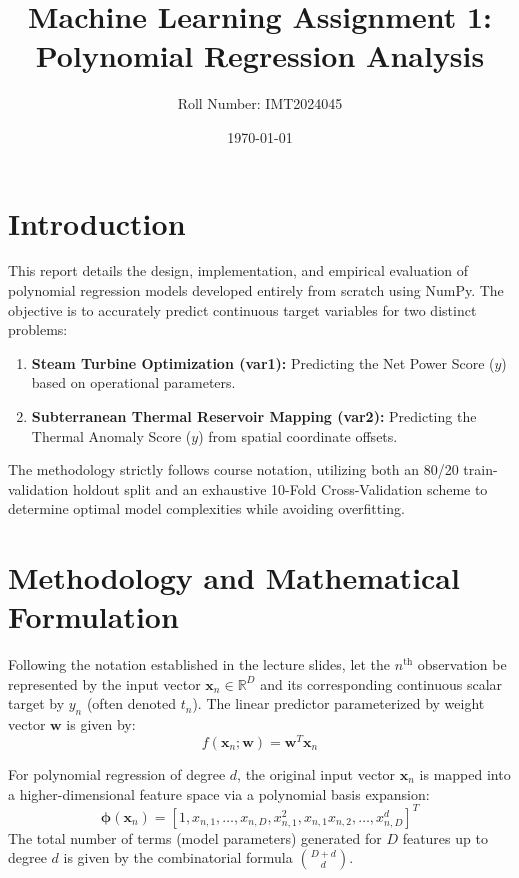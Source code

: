 \documentclass[12pt]{article}
\title{\textbf{Machine Learning Assignment 1: Polynomial Regression Analysis}}
\author{Roll Number: IMT2024045}
\date{\today}
\begin{document}
\maketitle

\section{Introduction}
This report details the design, implementation, and empirical evaluation of polynomial regression models developed entirely from scratch using NumPy. The objective is to accurately predict continuous target variables for two distinct problems:
\begin{enumerate}
    \item \textbf{Steam Turbine Optimization (var1):} Predicting the Net Power Score ($y$) based on operational parameters.
    \item \textbf{Subterranean Thermal Reservoir Mapping (var2):} Predicting the Thermal Anomaly Score ($y$) from spatial coordinate offsets.
\end{enumerate}
The methodology strictly follows course notation, utilizing both an 80/20 train-validation holdout split and an exhaustive 10-Fold Cross-Validation scheme to determine optimal model complexities while avoiding overfitting.

\section{Methodology and Mathematical Formulation}
Following the notation established in the lecture slides, let the $n^{\text{th}}$ observation be represented by the input vector $\mathbf{x}_n \in \mathbb{R}^D$ and its corresponding continuous scalar target by $y_n$ (often denoted $t_n$). The linear predictor parameterized by weight vector $\mathbf{w}$ is given by:
\begin{equation}
f(\mathbf{x}_n; \mathbf{w}) = \mathbf{w}^T \mathbf{x}_n
\end{equation}

For polynomial regression of degree $d$, the original input vector $\mathbf{x}_n$ is mapped into a higher-dimensional feature space via a polynomial basis expansion:
\begin{equation}
\boldsymbol{\phi}(\mathbf{x}_n) = \left[ 1, x_{n,1}, \dots, x_{n,D}, x_{n,1}^2, x_{n,1}x_{n,2}, \dots, x_{n,D}^d \right]^T
\end{equation}
The total number of terms (model parameters) generated for $D$ features up to degree $d$ is given by the combinatorial formula $\binom{D+d}{d}$.
\end{document}
